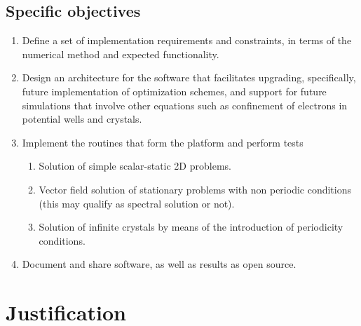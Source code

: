 \subsection{Specific objectives}
\begin{enumerate}
\item Define a set of implementation requirements and constraints, in terms of the numerical method\remove[SEC]{,} and expected functionality.  
\item Design an architecture for the software that facilitates upgrading, specifically, future implementation of optimization schemes, and support for future simulations that involve other equations such as confinement of electrons in potential wells and crystals.
\item Implement the routines that form the platform and perform tests   
	\begin{enumerate}
	\item Solution of simple scalar-static 2D problems.
	\item Vector field solution of stationary problems with non periodic conditions (this may qualify as spectral solution or not).
	\item Solution of infinite crystals by means of the introduction of periodicity conditions.
	\end{enumerate}

\item Document and share software, as well as results as open source.
\end{enumerate}

\section{Justification}

